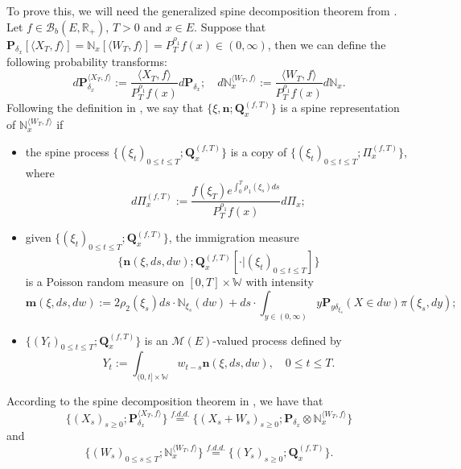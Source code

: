 \documentclass[12pt,a4paper]{amsart}
\theoremstyle{plain}
\theoremstyle{definition}
\numberwithin{equation}{section}
\begin{document}
    To prove this, we will need the generalized spine decomposition theorem from \cite{RenSongSun2017Spine}.
    Let $f\in \mathcal B_b(E,\mathbb R_+)$, $T >0$ and $x\in E$.
    Suppose that $\mathbf P_{\delta_x}[\langle X_T, f\rangle] = \mathbb N_x[\langle W_T, f\rangle] = P^{\rho_1}_T f(x) \in (0,\infty)$, then we can define the following probability transforms:
\begin{equation}
    d\mathbf P_{\delta_x}^{\langle X_T, f\rangle}
    := \frac{\langle X_T, f\rangle}{P_T^{\rho_1} f(x)} d\mathbf P_{\delta_x};
    \quad d\mathbb N_x^{\langle W_T, f\rangle}
    :=  \frac{\langle W_T, f\rangle}{P_T^{\rho_1} f(x)} d\mathbb N_x.
\end{equation}
    Following the definition in \cite{RenSongSun2017Spine}, we say that $\{\xi, \mathbf n;\mathbf Q_{x}^{(f,T)}\}$ is a spine representation of $\mathbb N_x^{\langle W_T, f\rangle}$ if
\begin{itemize}
\item
     the spine process
    $\{(\xi_t)_{0\leq t\leq T}; \mathbf Q^{(f,T)}_x\}$ is a copy of $\{(\xi_t)_{0\leq t\leq T}; \Pi^{(f,T)}_{x}\}$,
    where
\begin{equation}
    d\Pi_x^{(f,T)} := \frac{f(\xi_T)e^{\int_0^T \rho_1(\xi_s)ds}}{P^{\rho_1}_T f(x)} d \Pi_x;
\end{equation}
\item
    given $\{(\xi_t)_{0\leq t\leq T}; \mathbf Q^{(f,T)}_x\}$, 
    the immigration measure
\[ \{\mathbf n(\xi,ds,dw); \mathbf Q^{(f,T)}_x[\cdot |(\xi_t)_{0\leq t\leq T}]\}\]
    is a Poisson random measure on $[0,T] \times \mathbb W$ with intensity
\begin{equation}
\label{eq: conditional intensity}
    \mathbf m(\xi,ds,dw)
    := 2 \rho_2(\xi_s) ds \cdot \mathbb N_{\xi_s}(dw) + ds \cdot \int_{y\in (0,\infty)} y \mathbf P_{y\delta_{\xi_s}}(X\in dw) \pi(\xi_s,dy);
\end{equation}
\item
    $\{(Y_t)_{0\leq t\leq T}; \mathbf Q^{(f,T)}_x\}$ is an $\mathcal M(E)$-valued process defined by
\begin{equation}
    Y_t
    := \int_{(0,t] \times \mathbb W} w_{t-s} \mathbf n(\xi,ds,dw),
    \quad 0 \leq t\leq T.
\end{equation}
\end{itemize}
    According to the spine decomposition theorem in \cite{RenSongSun2017Spine}, we have that
\begin{equation}
\label{eq: Spine decomposition 1}
    \{(X_s)_{s \geq 0};\mathbf P_{\delta_x}^{\langle X_T, f\rangle}\}
    \overset{f.d.d.}{=} \{(X_s + W_s)_{s \geq 0};\mathbf P_{\delta_x} \otimes \mathbb N_x^{\langle W_T, f\rangle} \}
\end{equation}
    and
\begin{equation}
\label{eq: Spine decomposition 2}
    \{(W_s)_{0\leq s\leq T};\mathbb N_x^{\langle W_T, f\rangle}\}
    \overset{f.d.d.}{=} \{(Y_s)_{s \geq 0};\mathbf Q_x^{(f,T)}\}.
\end{equation}
\end{document}
